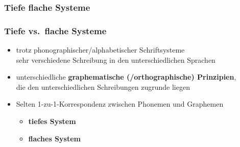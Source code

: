 \subsubsection{Tiefe \vs flache Systeme}

\begin{frame}
\frametitle{Tiefe vs.\ flache Systeme}

\begin{itemize}
	\item trotz phonographischer/alphabetischer Schriftsysteme \ras\\
              sehr verschiedene Schreibung in den unterschiedlichen Sprachen

	\item unterschiedliche \textbf{graphematische (/orthographische) Prinzipien},\\
          die den unterschiedlichen Schreibungen zugrunde liegen

	\item Selten 1-zu-1-Korrespondenz zwischen Phonemen und Graphemen
	
	\begin{itemize}
		\item \textbf{tiefes System}\\ 
		\vs
		\item \textbf{flaches System}
	\end{itemize}
\end{itemize}
\end{frame}


